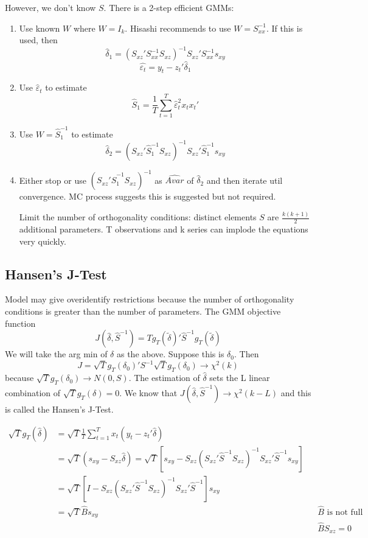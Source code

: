 \documentclass[11pt, a4paper, oneside]{article}
\theoremstyle{definition}
\theoremstyle{proposition}
\theoremstyle{corollary}
\theoremstyle{lemma}
\theoremstyle{theorem}
\begin{document}
However, we don't know $S$. There is a 2-step efficient GMMs:
\begin{enumerate}
\item Use known $W$ where $W = I_k$. Hisashi recommends to use $W = S_{xx}^{-1}$. If this is used, then
$$\hat{\delta}_1 = (S_{xz}'S_{xx}^{-1}S_{xz})^{-1}S_{xz}'S_{xx}^{-1}s_{xy}$$
$$\hat{\varepsilon_t} = y _t - z_t'\hat{\delta}_1$$
\item Use $\hat{\varepsilon}_t$ to estimate $$\hat{S}_1 = \frac{1}{T}\sum_{t=1}^T \hat{\varepsilon}_t^2 x_tx_t'$$
\item Use $W = \hat{S}_1^{-1}$ to estimate $$\hat{\delta}_2 = (S_{xz}'\hat{S}_1^{-1}S_{xz})^{-1}S_{xz}'\hat{S}_1^{-1}s_{xy}$$
\item Either stop or use $(S_{xz}'\hat{S}_1^{-1}S_{xz})^{-1}$ as $\hat{Avar}$ of $\hat{\delta}_2$ and then iterate util convergence. MC process suggests this is suggested but not required.

Limit the number of orthogonality conditions: distinct elements $S$ are $\frac{k(k+1)}{2}$ additional parameters. T observations and k series can implode the equations very quickly. 
\end{enumerate}

\subsection{Hansen's J-Test}

Model may give overidentify restrictions because the number of orthogonality conditions is greater than the number of parameters. The GMM objective function $$J(\hat{\delta}, \hat{S}^{-1}) = Tg_T(\tilde{\delta})' \hat{S}^{-1}g_T(\tilde{\delta})$$ 
We will take the arg min of $\delta$ as the above. Suppose this is $\delta_0$. Then
$$J = \sqrt{T}g_T(\delta_0)'S^{-1}\sqrt{T} g_T(\delta_0) \to \chi^2(k)$$ because $\sqrt{T}g_T(\delta_0) \to N(0, S)$. The estimation of $\hat{\delta}$ sets the L linear combination of $\sqrt{T}g_T(\delta) = 0$. We know that $J(\hat{\delta}, \hat{S}^{-1})\to \chi^2(k -L)$ and this is called the Hansen's J-Test.

\begin{align*}
\sqrt{T}g_T(\hat{\delta}) &= \sqrt{T} \frac{1}{T} \sum_{t=1}^T x_t(y_t - z_t'\hat{\delta})\\
&=\sqrt{T}(s_{xy} - S_{xz}\hat{\delta})= \sqrt{T}\left[s_{xy} - S_{xz}(S_{xz}'\hat{S}^{-1}S_{xz})^{-1}S_{xz}'\hat{S}^{-1}s_{xy}\right]\\
&= \sqrt{T}\left[ I - S_{xz}(S_{xz}'\hat{S}^{-1}S_{xz})^{-1}S_{xz}'\hat{S}^{-1}\right]s_{xy}\\
&=\sqrt{T}\hat{B}s_{xy} && \hat{B} \text{ is not full column rank}\\
& && \hat{B}S_{xz} = 0
\end{align*}
\end{document}
